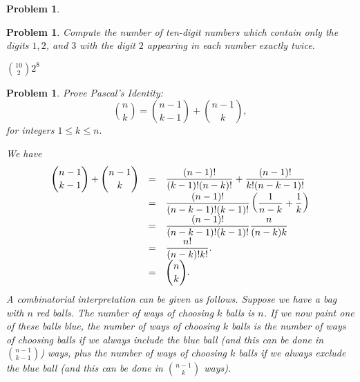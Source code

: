 \documentclass[11pt, openany]{book}
\theoremstyle{change} \theoremheaderfont{\blue\sffamily\bfseries}
\newtheorem{pro}[thm]{Problem}
\theoremstyle{nonumberplain} \theoremheaderfont{\sffamily\bfseries}
\def\binom#1#2{{#1\choose#2}}
\newcommand{\í}{\'{\i}}
\begin{document}
\begin{multicols}{2}
\begin{pro}
  \end{pro}
          \begin{pro} Compute the number of ten-digit numbers which contain only the
digits $1, 2$, and $3$ with the digit $2$ appearing in each number
exactly twice.\begin{answer} $\binom{10}{2} 2^8$

\end{answer}
  \end{pro}
\begin{pro} Prove {\em Pascal's Identity}:
$$ \binom{n}{k} = \binom{n - 1}{k - 1} + \binom{n - 1}{k},$$for
integers $1 \leq k \leq n.$ \begin{answer} We have $$
{\everymath{\displaystyle}\begin{array}{lcl}\binom{n - 1}{k - 1} +
\binom{n - 1}{k} & = &
\frac{(n - 1)!}{(k - 1)!(n - k)!} + \frac{(n - 1)!}{k!(n - k - 1)!} \\
& = & \frac{(n - 1)!}{(n - k - 1)!(k - 1)!}\left( \frac{1}{n - k} + \frac{1}{k}\right) \\
& = & \frac{(n - 1)!}{(n - k - 1)!(k - 1)!}\frac{n}{(n - k)k} \\
& = & \frac{n!}{(n - k)!k!} .\\
& = & \binom{n}{k}.\end{array}}$$ A combinatorial interpretation can
be given as follows.  Suppose we have a bag with $n$ red balls. The
number of ways of choosing $k$ balls is $n$. If we now paint one of
these balls blue, the number of ways of choosing $k$ balls is the
number of ways of choosing balls if we always {\em include} the blue
ball (and this can be done in $\binom{n - 1}{k - 1}$) ways, plus the
number of ways of choosing $k$ balls if we always {\em exclude} the
blue ball (and this can be done in $\binom{n - 1}{k}$ ways).
\end{answer}
\end{pro}



\end{multicols}
\end{document}
